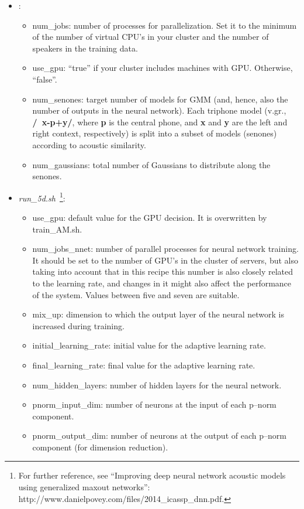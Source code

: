 \documentclass[11pt,a4paper,titlepage,twoside]{article}
\begin{document}
\begin{itemize}

\item {}:
  \begin{itemize}
  \item num\_jobs: number of processes for parallelization. Set it to the minimum of the number of virtual CPU's in your cluster and the number of speakers in the training data.
  \item use\_gpu: ``true'' if your cluster includes machines with GPU. Otherwise, ``false''.
  \item num\_senones: target number of models for GMM (and, hence, also the number of outputs in the neural network). Each triphone model (v.gr., \textbf{/~x-p+y/}, where \textbf{p} is the central phone, and \textbf{x} and \textbf{y} are the left and right context, respectively) is split into a subset of models (senones) according to acoustic similarity.
  \item num\_gaussians: total number of Gaussians to distribute along the senones.
  \end{itemize}

\item \textit{run\_5d.sh}~\footnote{For further reference, see ``Improving deep neural network acoustic models using generalized maxout networks'': http://www.danielpovey.com/files/2014\_icassp\_dnn.pdf.}:

  \begin{itemize}
  \item use\_gpu: default value for the GPU decision. It is overwritten by train\_AM.sh.
  \item num\_jobs\_nnet: number of parallel processes for neural network training. It should be set to the number of GPU's in the cluster of servers, but also taking into account that in this recipe this number is also closely related to the learning rate, and changes in it might also affect the performance of the system. Values between five and seven are suitable. 
  \item mix\_up: dimension to which the output layer of the neural network is increased during training.
  \item initial\_learning\_rate: initial value for the adaptive learning rate.
  \item final\_learning\_rate: final value for the adaptive learning rate.
  \item num\_hidden\_layers: number of hidden layers for the neural network.
  \item pnorm\_input\_dim: number of neurons at the input of each p--norm component.
  \item pnorm\_output\_dim: number of neurons at the output of each p--norm component (for dimension reduction).

  \end{itemize}

\end{itemize}
\end{document}
